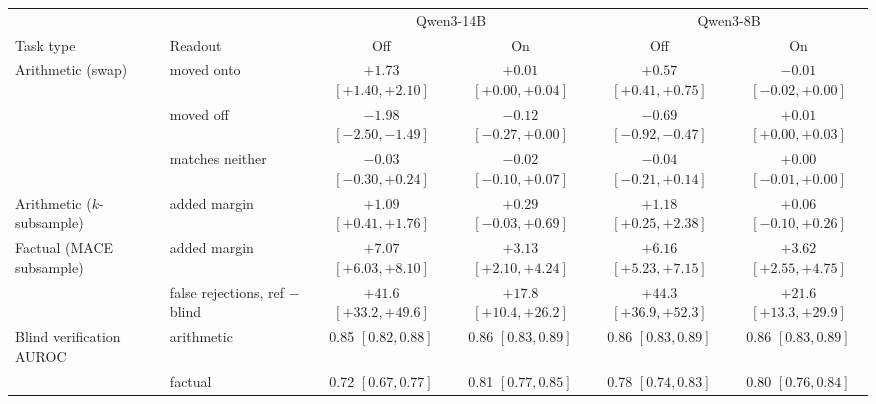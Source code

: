 \begin{tabular}{llcccc}
\toprule
& & \multicolumn{2}{c}{Qwen3-14B} & \multicolumn{2}{c}{Qwen3-8B} \\
\cmidrule(lr){3-4}\cmidrule(lr){5-6}
Task type & Readout & Off & On & Off & On \\
\midrule
Arithmetic (swap) & moved onto & $+1.73$ {\scriptsize$[+1.40,+2.10]$} & $+0.01$ {\scriptsize$[+0.00,+0.04]$} & $+0.57$ {\scriptsize$[+0.41,+0.75]$} & $-0.01$ {\scriptsize$[-0.02,+0.00]$} \\
 & moved off & $-1.98$ {\scriptsize$[-2.50,-1.49]$} & $-0.12$ {\scriptsize$[-0.27,+0.00]$} & $-0.69$ {\scriptsize$[-0.92,-0.47]$} & $+0.01$ {\scriptsize$[+0.00,+0.03]$} \\
 & matches neither & $-0.03$ {\scriptsize$[-0.30,+0.24]$} & $-0.02$ {\scriptsize$[-0.10,+0.07]$} & $-0.04$ {\scriptsize$[-0.21,+0.14]$} & $+0.00$ {\scriptsize$[-0.01,+0.00]$} \\
Arithmetic ($k$-subsample) & added margin & $+1.09$ {\scriptsize$[+0.41,+1.76]$} & $+0.29$ {\scriptsize$[-0.03,+0.69]$} & $+1.18$ {\scriptsize$[+0.25,+2.38]$} & $+0.06$ {\scriptsize$[-0.10,+0.26]$} \\
Factual (\textsc{MACE} subsample) & added margin & $+7.07$ {\scriptsize$[+6.03,+8.10]$} & $+3.13$ {\scriptsize$[+2.10,+4.24]$} & $+6.16$ {\scriptsize$[+5.23,+7.15]$} & $+3.62$ {\scriptsize$[+2.55,+4.75]$} \\
 & false rejections, ref $-$ blind & $+41.6$ {\scriptsize$[+33.2,+49.6]$} & $+17.8$ {\scriptsize$[+10.4,+26.2]$} & $+44.3$ {\scriptsize$[+36.9,+52.3]$} & $+21.6$ {\scriptsize$[+13.3,+29.9]$} \\
Blind verification AUROC & arithmetic & 0.85 {\scriptsize$[0.82,0.88]$} & 0.86 {\scriptsize$[0.83,0.89]$} & 0.86 {\scriptsize$[0.83,0.89]$} & 0.86 {\scriptsize$[0.83,0.89]$} \\
 & factual & 0.72 {\scriptsize$[0.67,0.77]$} & 0.81 {\scriptsize$[0.77,0.85]$} & 0.78 {\scriptsize$[0.74,0.83]$} & 0.80 {\scriptsize$[0.76,0.84]$} \\
\bottomrule
\end{tabular}
